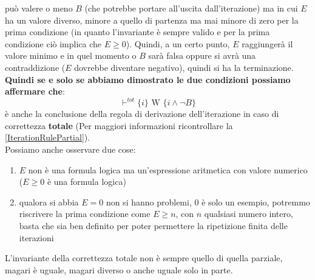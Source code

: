 				      				può valere o meno $B$ (che potrebbe portare all'uscita dall'iterazione) ma in
				      				cui $E$ ha un valore diverso, minore a quello di partenza ma mai minore di zero per
				      				la prima condizione (in quanto l'invariante è sempre valido e per la prima condizione ciò implica che $E \geq 0$). Quindi, a un
				      				certo punto, $E$ raggiungerà il valore minimo e in quel momento o $B$ sarà falsa oppure
				      				si avrà una contraddizione ($E$ dovrebbe diventare negativo), quindi si ha la
				      				terminazione. \\
				      				\textbf{Quindi se e solo se abbiamo dimostrato le due condizioni possiamo affermare che}:
				      				\[\vdash^{tot}\{i\}\mbox{ W }\{i\land\neg B\}\]
				      				è anche la conclusione della regola di derivazione dell'iterazione in caso
				      				di correttezza \textbf{totale} (Per maggiori informazioni ricontrollare la \ref{IterationRulePartial}).\\
				      				Possiamo anche osservare due cose:
				      				\begin{enumerate}
				      					\item $E$ non è una formula logica ma un'espressione aritmetica con valore
				      					      numerico ($E\geq 0$ è una formula logica)
				      					\item qualora si abbia $E=0$ non si hanno problemi, $0$ è solo un esempio,
				      					      potremmo riscrivere la prima condizione come $E\geq n$, con $n$ qualsiasi
				      					      numero intero, basta che sia ben definito per poter permettere la ripetizione
				      					      finita delle iterazioni
				      				\end{enumerate}
				      				\begin{nota}
				      				L'invariante della correttezza totale non è sempre quello di quella
				      				parziale, magari è uguale, magari diverso o anche uguale solo in parte.
				      				\end{nota}
				      			    
